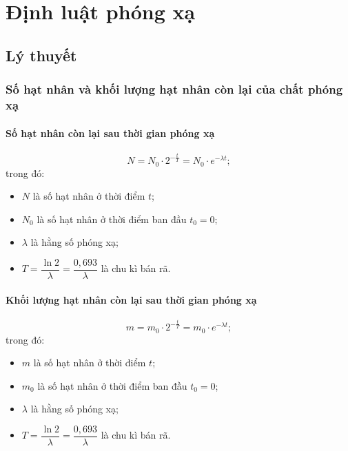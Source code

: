 
\chapter[Định luật phóng xạ]{Định luật phóng xạ}
\section{Lý thuyết}


\subsection{Số hạt nhân và khối lượng hạt nhân còn lại của chất phóng xạ}

\subsubsection{Số hạt nhân còn lại sau thời gian phóng xạ}
\begin{equation}
	N=N_0\cdot 2^{-\frac{t}{T}}=N_0\cdot e^{-\lambda t};
\end{equation}
trong đó:
\begin{itemize}
	\item $N$ là số hạt nhân ở thời điểm $t$;
	\item $N_0$ là số hạt nhân ở thời điểm ban đầu $t_0=0$;
	\item $\lambda$ là hằng số phóng xạ;
	\item $T=\dfrac{\ln2}{\lambda}=\dfrac{0,693}{\lambda}$ là chu kì bán rã.
\end{itemize}
\subsubsection{Khối lượng hạt nhân còn lại sau thời gian phóng xạ}
\begin{equation}
	m=m_0\cdot 2^{-\frac{t}{T}}=m_0\cdot e^{-\lambda t};
\end{equation}
trong đó:
\begin{itemize}
	\item $m$ là số hạt nhân ở thời điểm $t$;
	\item $m_0$ là số hạt nhân ở thời điểm ban đầu $t_0=0$;
	\item $\lambda$ là hằng số phóng xạ;
	\item $T=\dfrac{\ln2}{\lambda}=\dfrac{0,693}{\lambda}$ là chu kì bán rã.
\end{itemize}
